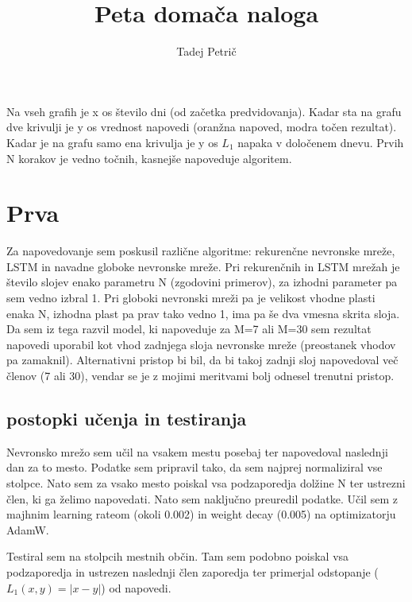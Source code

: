 \documentclass{article}
\begin{document}
\title{Peta domača naloga}
\author{Tadej Petrič}
\maketitle
Na vseh grafih je x os število dni (od začetka predvidovanja). Kadar sta na grafu dve krivulji je y os vrednost napovedi (oranžna napoved, modra točen rezultat). Kadar je na grafu samo ena krivulja je y os \(L_1\) napaka v določenem dnevu. Prvih N korakov je vedno točnih, kasnejše napoveduje algoritem.

\section{Prva}
Za napovedovanje sem poskusil različne algoritme: rekurenčne nevronske mreže, LSTM in navadne globoke nevronske mreže. Pri rekurenčnih in LSTM mrežah je število slojev enako parametru N (zgodovini primerov), za izhodni parameter pa sem vedno izbral 1. Pri globoki nevronski mreži pa je velikost vhodne plasti enaka N, izhodna plast pa prav tako vedno 1, ima pa še dva vmesna skrita sloja. Da sem iz tega razvil model, ki napoveduje za M=7 ali M=30 sem rezultat napovedi uporabil kot vhod zadnjega sloja nevronske mreže (preostanek vhodov pa zamaknil). Alternativni pristop bi bil, da bi takoj zadnji sloj napovedoval več členov (7 ali 30), vendar se je z mojimi meritvami bolj odnesel trenutni pristop.

\subsection*{postopki učenja in testiranja}
Nevronsko mrežo sem učil na vsakem mestu posebaj ter napovedoval naslednji dan za to mesto. Podatke sem pripravil tako, da sem najprej normaliziral vse stolpce. Nato sem za vsako mesto poiskal vsa podzaporedja dolžine N ter ustrezni člen, ki ga želimo napovedati. Nato sem naključno preuredil podatke. Učil sem z majhnim learning rateom (okoli 0.002) in weight decay (0.005) na optimizatorju AdamW.

Testiral sem na stolpcih mestnih občin. Tam sem podobno poiskal vsa podzaporedja in ustrezen naslednji člen zaporedja ter primerjal odstopanje (\(L_1(x,y)=\lvert x-y\rvert\)) od napovedi.
\end{document}
